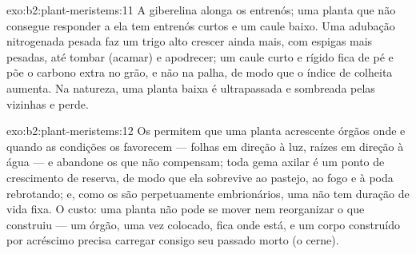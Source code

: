 \begin{solution}{exo:b2:plant-meristems:11}
A giberelina alonga os entrenós; uma planta que não consegue responder
a ela tem entrenós curtos e um caule baixo. Uma adubação nitrogenada
pesada faz um trigo alto crescer ainda mais, com espigas mais pesadas,
até tombar (acamar) e apodrecer; um caule curto e rígido fica de pé e
põe o carbono extra no grão, e não na palha, de modo que o índice de
colheita aumenta. Na natureza, uma planta baixa é ultrapassada e
sombreada pelas vizinhas e perde.
\end{solution}

\begin{solution}{exo:b2:plant-meristems:12}
Os  permitem que uma planta acrescente órgãos onde e quando
as condições os favorecem --- folhas em direção à luz, raízes em
direção à água --- e abandone os que não compensam; toda gema axilar é
um ponto de crescimento de reserva, de modo que ela sobrevive ao
pastejo, ao fogo e à poda rebrotando; e, como os  são
perpetuamente embrionários, uma  não tem duração de vida fixa. O
custo: uma planta não pode se mover nem reorganizar o que construiu ---
um órgão, uma vez colocado, fica onde está, e um corpo construído por
acréscimo precisa carregar consigo seu passado morto (o cerne).
\end{solution}

